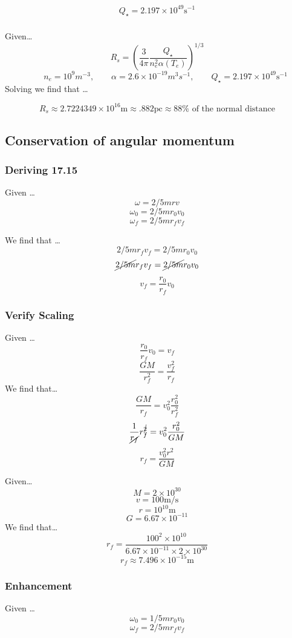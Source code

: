 \documentclass{article}
\begin{document}
\[\boxed{Q_\star = 2.197 \times 10^{49} \text{s}^{-1}}\]

\subsubsection{}
Given\dots 
\[R_s = \left(\frac{3}{4\pi} \frac{Q_\star }{n_e^2\alpha (T_e)}\right)^{1/3}\]
\[\qquad n_e = 10^9 m^{-3},
\qquad \alpha = 2.6 \times 10^{-19}m^3s^{-1},
\qquad Q_\star = 2.197 \times 10^{49} \text{s}^{-1}\]
Solving we find that \dots

\[
\boxed{
   R_s \approx 2.7224349\times 10^{16}\text{m} \approx .882\text{pc} \approx 88\% \text{ of the normal distance}
}\]

\subsection{Conservation of angular momentum}
\subsubsection{Deriving 17.15}
Given \dots
\[\omega = 2/5 mrv\]
\[\omega_0 = 2/5 mr_0 v_0\]
\[\omega_f= 2/5 mr_f v_f\]

We find that \dots
\[2/5 mr_f v_f = 2/5 mr_0 v_0\]
\[\cancel{2/5 m}r_f v_f = \cancel{2/5 m}r_0 v_0\]
\[\boxed{v_f = \frac{r_0}{r_f} v_0 }\]

\subsubsection{Verify Scaling}
Given \dots
\[\frac{r_0}{r_f} v_0 = v_f \]
\[\frac{GM}{r_f^2} = \frac{v_f^2}{r_f}\]
We find that\dots
\[\frac{GM}{r_f} = v_0^2 \frac{r_0^2}{r_f^2}\]
\[\frac{1}{\cancel{r_f}}r_f^{\cancel{2}} = v_0^2 \frac{r_0^2}{GM}\]
\[\boxed{r_f = \frac{v_0^2 r^2 }{GM}}\]

Given\dots
\[M = 2 \times 10^{30}\]
\[v = 100 \text{m/s}\]
\[r = 10^{10}\text{m}\]
\[G = 6.67 \times 10^{-11}\]
We find that\dots
\[r_f = \frac{100^2 \times 10^{10}}{6.67\times 10^{-11} \times {2 \times 10^{30}}}\]
\[\boxed{r_f \approx 7.496 \times 10^{-15} \text{m}}\]


\subsubsection{Enhancement}

Given \dots
\[\omega_0 = 1/5 mr_0 v_0\]
\[\omega_f= 2/5 mr_f v_f\]
\end{document}
